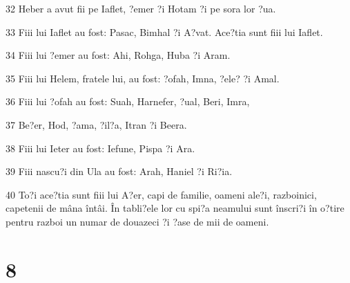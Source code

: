 \par 32 Heber a avut fii pe Iaflet, ?emer ?i Hotam ?i pe sora lor ?ua.
\par 33 Fiii lui Iaflet au fost: Pasac, Bimhal ?i A?vat. Ace?tia sunt fiii lui Iaflet.
\par 34 Fiii lui ?emer au fost: Ahi, Rohga, Huba ?i Aram.
\par 35 Fiii lui Helem, fratele lui, au fost: ?ofah, Imna, ?ele? ?i Amal.
\par 36 Fiii lui ?ofah au fost: Suah, Harnefer, ?ual, Beri, Imra,
\par 37 Be?er, Hod, ?ama, ?il?a, Itran ?i Beera.
\par 38 Fiii lui Ieter au fost: Iefune, Pispa ?i Ara.
\par 39 Fiii nascu?i din Ula au fost: Arah, Haniel ?i Ri?ia.
\par 40 To?i ace?tia sunt fiii lui A?er, capi de familie, oameni ale?i, razboinici, capetenii de mâna întâi. În tabli?ele lor cu spi?a neamului sunt înscri?i în o?tire pentru razboi un numar de douazeci ?i ?ase de mii de oameni.

\chapter{8}

